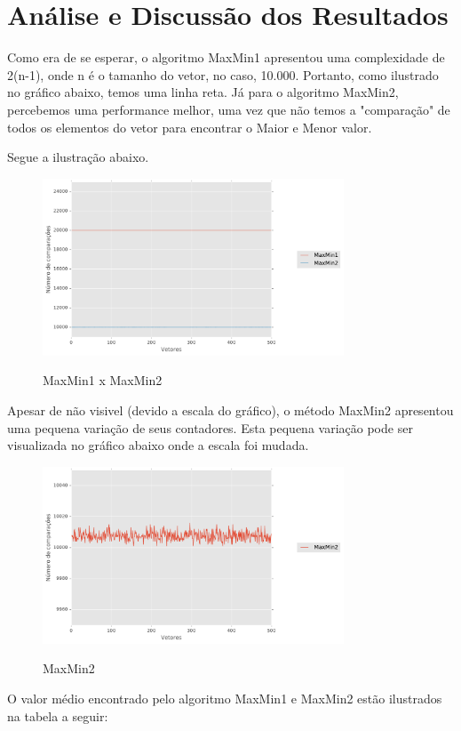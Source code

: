 


\chapter{Análise e Discussão dos Resultados}

Como era de se esperar, o algoritmo MaxMin1 apresentou uma complexidade de 2(n-1), onde n é o tamanho do vetor, no caso, 10.000. Portanto, como ilustrado no gráfico abaixo, temos uma linha reta. Já para o algoritmo MaxMin2, percebemos uma performance melhor, uma vez que não temos a "comparação" de todos os elementos do vetor para encontrar o Maior e Menor valor. 

Segue a ilustração abaixo. 

\begin{figure}[!htb]
	\centering
	\caption{MaxMin1 x MaxMin2}
	\includegraphics[width=0.8\textwidth]{./04-figuras/MaxMin1xMaxMin2.pdf}
	\label{fig:maxmin1vsmaxmin2}
\end{figure}

\pagebreak
Apesar de não visivel (devido a escala do gráfico), o método MaxMin2 apresentou uma pequena variação de seus contadores. Esta pequena variação pode ser visualizada no gráfico abaixo onde a escala foi mudada. 


\begin{figure}[!htb]
	\centering
	\caption{MaxMin2}
	\includegraphics[width=0.8\textwidth]{./04-figuras/MaxMin2.pdf}
	\label{fig:maxmin2}
\end{figure}



O valor médio encontrado pelo algoritmo MaxMin1 e MaxMin2 estão ilustrados na tabela a seguir: 




